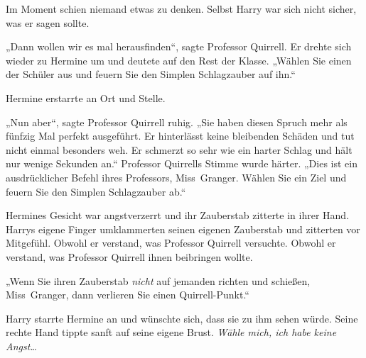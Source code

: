 Im Moment schien niemand etwas zu denken. Selbst Harry war sich nicht sicher, was er sagen sollte.

„Dann wollen wir es mal herausfinden“, sagte Professor Quirrell. Er drehte sich wieder zu Hermine um und deutete auf den Rest der Klasse. „Wählen Sie einen der Schüler aus und feuern Sie den Simplen Schlagzauber auf ihn.“

Hermine erstarrte an Ort und Stelle.

„Nun aber“, sagte Professor Quirrell ruhig. „Sie haben diesen Spruch mehr als fünfzig Mal perfekt ausgeführt. Er hinterlässt keine bleibenden Schäden und tut nicht einmal besonders weh. Er schmerzt so sehr wie ein harter Schlag und hält nur wenige Sekunden an.“ Professor Quirrells Stimme wurde härter. „Dies ist ein ausdrücklicher Befehl ihres Professors, Miss~Granger. Wählen Sie ein Ziel und feuern Sie den Simplen Schlagzauber ab.“

Hermines Gesicht war angstverzerrt und ihr Zauberstab zitterte in ihrer Hand. Harrys eigene Finger umklammerten seinen eigenen Zauberstab und zitterten vor Mitgefühl. Obwohl er verstand, was Professor Quirrell versuchte. Obwohl er verstand, was Professor Quirrell ihnen beibringen wollte.

„Wenn Sie ihren Zauberstab \emph{nicht} auf jemanden richten und schießen, Miss~Granger, dann verlieren Sie einen Quirrell-Punkt.“

Harry starrte Hermine an und wünschte sich, dass sie zu ihm sehen würde. Seine rechte Hand tippte sanft auf seine eigene Brust. \emph{Wähle mich, ich habe keine Angst…}

